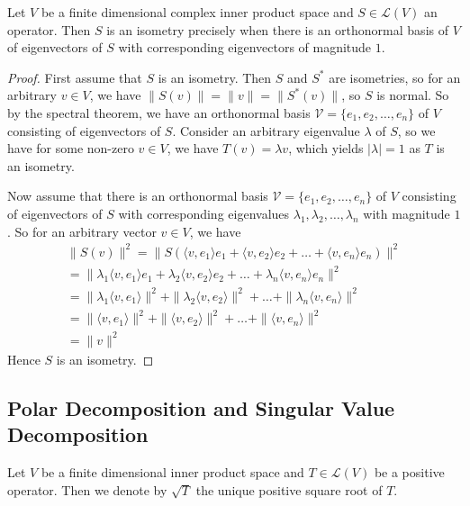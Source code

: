 \documentclass[]{article}
\begin{document}
\begin{thm}
		Let $V$ be a finite dimensional complex inner product space and $S \in \mathcal{L}(V)$ an operator. Then $S$ is an isometry precisely when there is an orthonormal basis of $V$ of eigenvectors of $S$ with corresponding eigenvectors of magnitude $1$.
\end{thm}

\begin{proof}
		First assume that $S$ is an isometry. Then $S$ and $S^*$ are isometries, so for an arbitrary $v \in V$, we have $\|S(v)\| = \|v\| = \|S^*(v)\|$, so $S$ is normal. So by the spectral theorem, we have an orthonormal basis $\mathcal{V} = \{e_1,e_2,\ldots,e_n\}$ of $V$ consisting of eigenvectors of $S$. Consider an arbitrary eigenvalue $\lambda$ of $S$, so we have for some non-zero $v \in V$, we have $T(v) = \lambda v$, which yields $|\lambda| = 1$ as $T$ is an isometry.

		Now assume that there is an orthonormal basis $\mathcal{V} = \{e_1,e_2,\ldots,e_n\}$ of $V$ consisting of eigenvectors of $S$ with corresponding eigenvalues $\lambda_1,\lambda_2,\ldots,\lambda_n$ with magnitude $1$. So for an arbitrary vector $v \in V$, we have
		\begin{align*}
				\|S(v)\|^2 = \|S(\langle v, e_1 \rangle e_1 + \langle v, e_2 \rangle e_2 + \ldots + \langle v, e_n \rangle e_n)\|^2 \\
				= \|\lambda_1 \langle v, e_1 \rangle e_1 + \lambda_2 \langle v, e_2 \rangle e_2 + \ldots + \lambda_n \langle v, e_n \rangle e_n\|^2 \\
				= \|\lambda_1 \langle v, e_1 \rangle \|^2 + \|\lambda_2 \langle v, e_2 \rangle \|^2 + \ldots + \|\lambda_n \langle v, e_n \rangle \|^2 \\
				= \|\langle v, e_1 \rangle \|^2 + \|\langle v, e_2 \rangle \|^2 + \ldots + \|\langle v, e_n \rangle \|^2 \\
				= \|v\|^2
		\end{align*}
	Hence $S$ is an isometry.
\end{proof}

\subsection{Polar Decomposition and Singular Value Decomposition}

\begin{defi} 
		Let $V$ be a finite dimensional inner product space and $T \in \mathcal{L}(V)$ be a positive operator. Then we denote by $\sqrt T$ the unique positive square root of $T$.
\end{defi}
\end{document}
